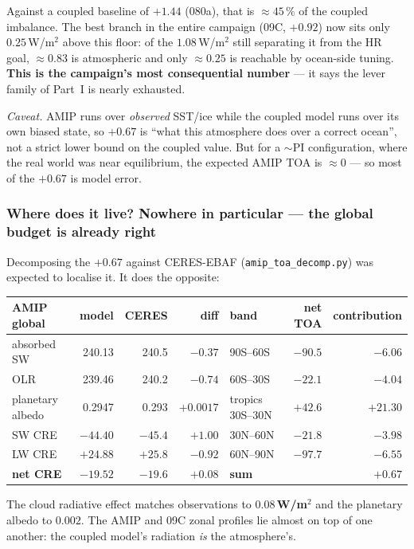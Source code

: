 \documentclass[10pt]{article}
\begin{document}
Against a coupled baseline of $+1.44$ (080a), that is $\approx45\,\%$ of the coupled imbalance. The best
branch in the entire campaign (09C, $+0.92$) now sits only $0.25$\,W/m$^2$ above this floor: of the
$1.08$\,W/m$^2$ still separating it from the HR goal, $\approx0.83$ is atmospheric and only $\approx0.25$ is
reachable by ocean-side tuning. \textbf{This is the campaign's most consequential number} --- it says the
lever family of Part~I is nearly exhausted.

\emph{Caveat.} AMIP runs over \emph{observed} SST/ice while the coupled model runs over its own biased
state, so $+0.67$ is ``what this atmosphere does over a correct ocean'', not a strict lower bound on the
coupled value. But for a $\sim$PI configuration, where the real world was near equilibrium, the expected
AMIP TOA is $\approx0$ --- so most of the $+0.67$ is model error.

\subsubsection{Where does it live? Nowhere in particular --- the global budget is already right}\label{sub:toadecomp}
Decomposing the $+0.67$ against CERES-EBAF (\texttt{amip\_toa\_decomp.py}) was expected to localise it. It does
the opposite:

\begin{center}\small
\begin{tabular}{l r r r @{\hskip 1.2em} l r r}
\toprule
AMIP global & model & CERES & diff & band & net TOA & contribution \\
\midrule
absorbed SW      & 240.13 & 240.5 & $-0.37$  & 90S--60S        & $-90.5$ & $-6.06$ \\
OLR              & 239.46 & 240.2 & $-0.74$  & 60S--30S        & $-22.1$ & $-4.04$ \\
planetary albedo & 0.2947 & 0.293 & $+0.0017$& tropics 30S--30N& $+42.6$ & $+21.30$ \\
SW CRE           & $-44.40$ & $-45.4$ & $+1.00$ & 30N--60N     & $-21.8$ & $-3.98$ \\
LW CRE           & $+24.88$ & $+25.8$ & $-0.92$ & 60N--90N     & $-97.7$ & $-6.55$ \\
\textbf{net CRE} & $\mathbf{-19.52}$ & $\mathbf{-19.6}$ & $\mathbf{+0.08}$ & \textbf{sum} & & $\mathbf{+0.67}$ \\
\bottomrule
\end{tabular}
\end{center}

The cloud radiative effect matches observations to \textbf{$0.08$\,W/m$^2$} and the planetary albedo to
$0.002$. The AMIP and 09C zonal profiles lie almost on top of one another: the coupled model's radiation
\emph{is} the atmosphere's.
\end{document}
